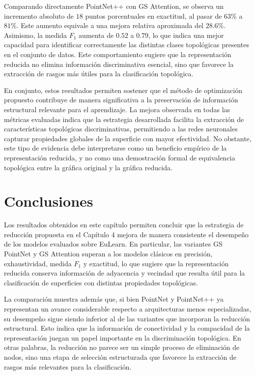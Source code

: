 Comparando directamente PointNet++ con GS Attention, se observa un incremento absoluto de $18$ puntos porcentuales en exactitud, al pasar de $63\%$ a $81\%$. Este aumento equivale a una mejora relativa aproximada del $28.6\%$. Asimismo, la medida $F_1$ aumenta de $0.52$ a $0.79$, lo que indica una mejor capacidad para identificar correctamente las distintas clases topológicas presentes en el conjunto de datos. Este comportamiento sugiere que la representación reducida no elimina información discriminativa esencial, sino que favorece la extracción de rasgos más útiles para la clasificación topológica.

En conjunto, estos resultados permiten sostener que el método de optimización propuesto contribuye de manera significativa a la preservación de información estructural relevante para el aprendizaje. La mejora observada en todas las métricas evaluadas indica que la estrategia desarrollada facilita la extracción de características topológicas discriminativas, permitiendo a las redes neuronales capturar propiedades globales de la superficie con mayor efectividad. No obstante, este tipo de evidencia debe interpretarse como un beneficio empírico de la representación reducida, y no como una demostración formal de equivalencia topológica entre la gráfica original y la gráfica reducida.

\section{Conclusiones}
Los resultados obtenidos en este capítulo permiten concluir que la estrategia de reducción propuesta en el Capítulo 4 mejora de manera consistente el desempeño de los modelos evaluados sobre EuLearn. En particular, las variantes GS PointNet y GS Attention superan a los modelos clásicos en precisión, exhaustividad, medida $F_1$ y exactitud, lo que sugiere que la representación reducida conserva información de adyacencia y vecindad que resulta útil para la clasificación de superficies con distintas propiedades topológicas.

La comparación muestra además que, si bien PointNet y PointNet++ ya representan un avance considerable respecto a arquitecturas menos especializadas, su desempeño sigue siendo inferior al de las variantes que incorporan la reducción estructural. Esto indica que la información de conectividad y la compacidad de la representación juegan un papel importante en la discriminación topológica. En otras palabras, la reducción no parece ser un simple proceso de eliminación de nodos, sino una etapa de selección estructurada que favorece la extracción de rasgos más relevantes para la clasificación.


